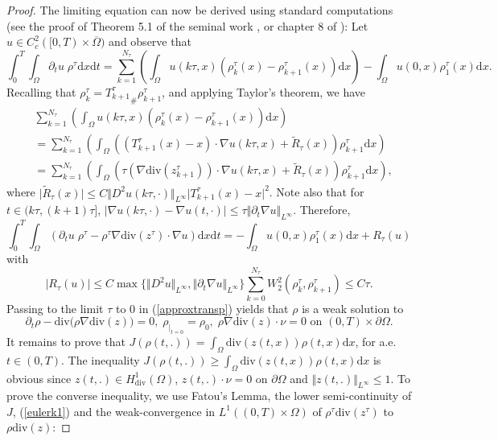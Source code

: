 \documentclass[12pt, a4paper]{article}
\numberwithin{equation}{section}
\theoremstyle{plain}
\theoremstyle{definition}
\theoremstyle{remark}
\newcommand{\dive}{\mathrm{div}}
\newcommand{\Omb}{\overline{\Omega}}
\newcommand\pref[1]{(\ref{#1})}
\begin{document}
\begin{proof}
\smallskip


The limiting equation can now be derived using standard computations (see the proof of Theorem 5.1 of the seminal work \cite{jordan1998variational}, or chapter 8 of \cite{santambrogio2015optimal}):
Let $u\in C_c^2([0,T)\times \Omb)$ and observe that
\begin{equation*}
\int_0^T \int_\Omega \partial_t  u \; \rho^\tau \mathrm{d}x\mathrm{d}t = \sum_{k=1}^{N_\tau} \left( \int_\Omega u(k\tau,x) (\rho_k^\tau(x) -  \rho_{k+1}^\tau(x))\mathrm{d}x \right)- \int_\Omega u(0,x) \rho_1^\tau(x) \mathrm{d}x.
\end{equation*}
Recalling that $\rho_k^\tau = {T_{k+1}^\tau}_\# \rho_{k+1}^\tau$, and applying Taylor's theorem, we have 
\begin{align*}
 &\sum_{k=1}^{N_\tau } \left( \int_\Omega u(k\tau,x) (\rho_k^\tau(x) - \rho_{k+1}^\tau(x))\mathrm{d}x \right)\\
 &=
\sum_{k=1}^{N_\tau } \left( \int_\Omega ((T_{k+1}^\tau(x)-x) \cdot \nabla u(k\tau,x) + \tilde R_\tau(x)  )    \rho_{k+1}^\tau \mathrm{d}x \right)\\
&= \sum_{k=1}^{N_\tau } \left( \int_\Omega  ( \tau( \nabla \dive(z^\tau_{k+1}))\cdot \nabla u(k\tau,x)  + \tilde R_\tau (x)  )\rho_{k+1}^\tau \mathrm{d}x \right),
\end{align*}
where $\vert \tilde R_\tau(x) \vert \leq C \Vert  D^2 u (k\tau, \cdot)\Vert_{L^\infty} \vert T_{k+1}^\tau(x) - x\vert^2$.
Note also that  for $t \in (k\tau, (k+1)\tau]$, $\vert \nabla u(k\tau, \cdot) - \nabla u(t,\cdot) \vert \leq \tau \Vert \partial_t \nabla u\Vert_{L^\infty}$.
Therefore,
\begin{equation}\label{approxtransp}
\int_0^T \int_\Omega (\partial_t  u \;  \rho^\tau-\rho^\tau  \nabla \dive(z^\tau)\cdot \nabla u) \mbox{d}x \mbox{d}t=-\int_\Omega u(0,x) \rho_1^\tau(x) \mbox{d} x+R_\tau(u)
\end{equation}
with
\begin{equation}
\vert R_\tau(u) \vert \le C \max\{\Vert D^2 u \Vert_{L^\infty}, \Vert  \partial_t \nabla u \Vert_{L^\infty}\} \sum_{k=0}^{N_\tau}  W_2^2(\rho_k^\tau, \rho_{k+1}^\tau) \le C \tau.
\end{equation}
Passing to the limit $\tau$ to $0$ in \pref{approxtransp} yields that $\rho$ is a weak solution to 
\[\partial_t \rho -\dive \Big(\rho \nabla \dive (z)\Big)=0, \;  \rho_{\vert_{t=0}}=\rho_0, \; \rho \nabla \dive (z) \cdot \nu=0  \mbox{ on }  (0,T)\times\partial \Omega.\]
It remains to prove that $J(\rho(t,.))=\int_\Omega \dive(z(t,x)) \rho(t,x) \mbox{d}x$,  for a.e. $t\in (0,T)$. The inequality $J(\rho(t,.))\ge \int_\Omega \dive(z(t,x)) \rho(t,x) \mbox{d}x$ is obvious since $z(t,.) \in H^1_{\dive}(\Omega)$, $z(t,.)\cdot \nu=0$ on $\partial \Omega$ and  $\Vert z(t,.)\Vert_{L^{\infty}}\le 1$. To prove the converse inequality, we use Fatou's Lemma, the lower semi-continuity of $J$, \pref{eulerk1} and the weak-convergence in $L^1((0,T)\times \Omega)$ of $\rho^\tau  \dive( z^\tau)$ to $\rho  \dive( z)$:

\end{proof}
\end{document}
